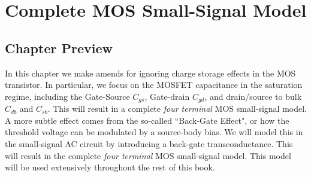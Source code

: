 \chapter{Complete MOS Small-Signal Model}
\graphicspath{{./figs_mos_ss_ac/}}
\section{Chapter Preview}
In this chapter we make amends for ignoring charge storage effects in the MOS transistor.  In particular, we focus on the MOSFET capacitance in the saturation regime, including the Gate-Source $C_{gs}$, Gate-drain $C_{gd}$, and drain/source to bulk $C_{db}$ and $C_{sb}$.  This will result in a complete \emph{four terminal} MOS small-signal model.  
A more subtle effect comes from the so-called ``Back-Gate Effect", or how the threshold voltage can be modulated by a source-body bias.  We will model this in the small-signal AC circuit by introducing a back-gate transconductance.  This will result in the complete \emph{four terminal} MOS small-signal model.  This model will be used extensively throughout the rest of this book.
%
%
%
% 
